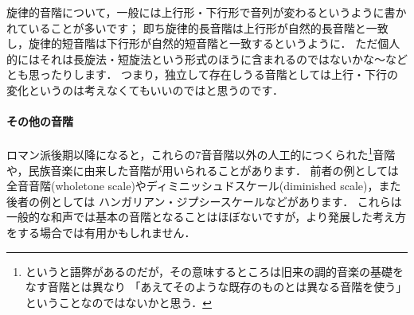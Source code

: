\documentclass[dvipdfmx,uplatex,b5paper,openany,jbase=12Q,nomag*,textwidth-limit=44%
               ]{gachimuchi}
\begin{document}
\begin{Music}[0.95\linewidth]
  \nostartrule%
  \Startpiece%
  \Notes{}%
  \en\doublebar%
  \Notes{}%
  \en\doublebar%
  \Notes{}%
  \en\setdoublebar\alaligne%
  \Notes{}%
  \en\doublebar%
  \Notes{}%
  \en\doublebar%
  \Notes{}%
  \en\setdoublebar%
  \endpiece%
\end{Music}

\begin{Yodan}
旋律的音階について，一般には上行形・下行形で音列が変わるというように書かれていることが多いです；
即ち旋律的長音階は上行形が自然的長音階と一致し，旋律的短音階は下行形が自然的短音階と一致するというように．
ただ個人的にはそれは長旋法・短旋法という形式のほうに含まれるのではないかな～などとも思ったりします．
つまり，独立して存在しうる音階としては上行・下行の変化というのは考えなくてもいいのではと思うのです．
\end{Yodan}

\paragraph{その他の音階}
ロマン派後期以降になると，これらの7音音階以外の人工的につくられた\footnote{%
  というと語弊があるのだが，その意味するところは旧来の調的音楽の基礎をなす音階とは異なり
  「あえてそのような既存のものとは異なる音階を使う」ということなのではないかと思う．
}音階や，民族音楽に由来した音階が用いられることがあります．
前者の例としては全音音階(wholetone scale)やディミニッシュドスケール(diminished scale)，また後者の例としては
ハンガリアン・ジプシースケールなどがあります．
これらは一般的な和声では基本の音階となることはほぼないですが，より発展した考え方をする場合では有用かもしれません．
\end{document}

